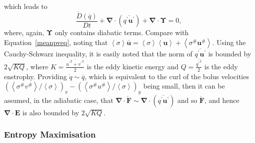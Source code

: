 \documentclass[10pt,a4paper]{report}
\newcommand*\thkmean[1]{\overline{#1}}
\newcommand*\thkres[1]{{#1}^{\prime}}
\newcommand*\nthkmean[1]{\left\langle{#1}\right\rangle}
\newcommand*\nthkres[1]{{#1}^{\#}}
\newcommand*\spec[1]{\mathring{#1}}
\newcommand*\equref[1]{Equation~\eqref{#1}}
\begin{document}
                      which leads  to
                      \begin{equation}
                      \frac{\spec{D} \left( \thkmean{q}\right)}{D t}
                      + \boldsymbol{\nabla}\cdot\left(\thkmean{\thkres{q} \thkres{\boldsymbol{u}}}\right)
                      +\boldsymbol{\nabla}\cdot\boldsymbol{\Upsilon}=0 ,
                      \end{equation}
                      where, again, $\boldsymbol{\Upsilon}$ only contains
                      diabatic terms. Compare with \equref{meanpveq}, noting that
                       ${\nthkmean{\sigma}\thkmean{\boldsymbol{u}}=\nthkmean{\sigma}\nthkmean{\boldsymbol{u}} + \nthkmean{\nthkres{\sigma}\nthkres{\boldsymbol{u}}}}$.
                       Using the Cauchy-Schwarz inequality, it is easily noted that
                       the norm of $\thkmean{\thkres{q} \thkres{\boldsymbol{u}}}$ is bounded
                       by $2\sqrt{KQ}$, where $K = \frac{\thkmean{{\thkres{u}}^{2} +
                       	{\thkres{v}}^{2}}}{2}$ is the eddy kinetic energy and $Q =
                        \frac{\thkmean{{\thkres{q}}^{2}}}{2}$ is the eddy enstrophy.
                       Providing $\spec{q} \sim \thkmean{q}$, which is equivalent 
                       to the  curl of the bolus velocities $\left(\nthkmean{\nthkres{\sigma}\nthkres{v}}/\nthkmean{\sigma}\right)_{x}-\left(\nthkmean{\nthkres{\sigma}\nthkres{u}}/\nthkmean{\sigma}\right)_{y}$ 
                       being small, then it can be assumed, in the adiabatic case,
                       that $\boldsymbol{\nabla}\cdot\spec{\boldsymbol{F}} \sim \boldsymbol{\nabla}\cdot\left(\thkmean{\thkres{q} \thkres{\boldsymbol{u}}}\right)$ and so $\spec{\boldsymbol{F}}$,
                       and hence $\boldsymbol{\nabla}\cdot\boldsymbol{E}$
                       is also bounded by  $2\sqrt{KQ}$.
                       
                       
                      
                      
                      
                      
                      
                      \subsubsection{Entropy  Maximisation}
                      \label{entropy}
                     
\end{document}
